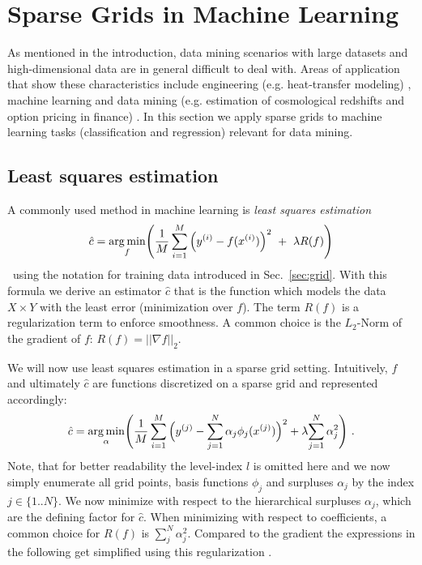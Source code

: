 \section{Sparse Grids in Machine Learning}

As mentioned in the introduction, data mining scenarios with large datasets
and high-dimensional data are in general difficult to deal with.
Areas of application
that show these characteristics include engineering (e.g. heat-transfer
modeling) \cite{disspeh},
machine learning and data mining (e.g. estimation of cosmological redshifts
and option pricing in finance) \cite{disspfl}. In this section
we apply sparse grids to machine learning tasks
(classification and regression) relevant for data mining.
\par
\subsection{Least squares estimation}
A commonly used method in machine learning is \emph{least squares estimation}
$$\hat{c} = \underset{f}{\text{arg \hspace{-0.5mm}min}}\Bigg(\frac{1}{M}\sum\limits_{i = 1}^{M}{\Big(y^{(i)} - f(x^{(i)})\Big)^2 \ + \ \lambda R(f)} \Bigg)$$ \
using the notation for training data 
introduced in Sec.~\ref{sec:grid}. With this formula we
derive an estimator $\hat{c}$ that is the function which models the
data $X \times Y$ with the least error (minimization over $f$).
The term $R(f)$ is a regularization term to enforce smoothness. A common choice
is the $L_2$-Norm of the gradient of $f$: $R(f) = ||\nabla f||_2$.
\par
We will now use least squares estimation in a sparse grid setting. Intuitively,
$f$ and ultimately $\hat{c}$
 are functions discretized on a sparse grid and represented
accordingly:
$$\hat{c} = \underset{{\alpha}}{\text{arg \hspace{-0.5mm}min}}\Bigg(\frac{1}{M}
\sum\limits_{i = 1}^{M}{\Big(y^{(j)} - {\sum_{j=1}^N{\alpha_j}\phi_j(x^{(j)})}\Big)^2 +
  \lambda {\sum_{j=1}^N{\alpha_j^2}}}\color{black} \Bigg) \ .$$
Note, that for better readability the level-index $l$ is omitted here and
we now simply enumerate all grid points, basis functions $\phi_j$ and surpluses
$\alpha_j$
 by the index $j \in \{1..N\}$.
We now minimize with respect to the hierarchical surpluses $\alpha_j$,
which are the defining factor for $\hat{c}$.
When minimizing with respect to coefficients, a common choice for
$R(f)$ is $\sum_j^N{\alpha_j^2}$. Compared to the gradient the
expressions in the following get simplified using this regularization
\cite{disspfl}.
